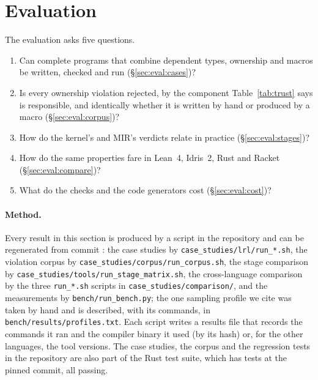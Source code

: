 \section{Evaluation}\label{sec:eval}

The evaluation asks five questions.
\begin{enumerate}\setlength\itemsep{1pt}
\item[\textbf{E1}] Can complete programs that combine dependent types, ownership and macros be written, checked and run (\S\ref{sec:eval:cases})?
\item[\textbf{E2}] Is every ownership violation rejected, by the component Table~\ref{tab:trust} says is responsible, and identically whether it is written by hand or produced by a macro (\S\ref{sec:eval:corpus})?
\item[\textbf{E3}] How do the kernel's and MIR's verdicts relate in practice (\S\ref{sec:eval:stages})?
\item[\textbf{E4}] How do the same properties fare in Lean~4, Idris~2, Rust and Racket (\S\ref{sec:eval:compare})?
\item[\textbf{E5}] What do the checks and the code generators cost (\S\ref{sec:eval:cost})?
\end{enumerate}

\paragraph{Method.}
Every result in this section is produced by a script in the repository and can be regenerated from commit \texttt{\PinnedCommitShort}: the case studies by \texttt{case\_studies/\allowbreak lrl/\allowbreak run\_*.sh}, the violation corpus by \texttt{case\_studies/\allowbreak corpus/\allowbreak run\_corpus.sh}, the stage comparison by \texttt{case\_studies/\allowbreak tools/\allowbreak run\_stage\_matrix.sh}, the cross-language comparison by the three \texttt{run\_*.sh} scripts in \texttt{case\_studies/\allowbreak comparison/}, and the measurements by \texttt{bench/\allowbreak run\_bench.py}; the one sampling profile we cite was taken by hand and is described, with its commands, in \texttt{bench/\allowbreak results/\allowbreak profiles.txt}.
Each script writes a results file that records the commands it ran and the compiler binary it used (by its hash) or, for the other languages, the tool versions.
The case studies, the corpus and the regression tests in the repository are also part of the Rust test suite, which has \NumTestsPassed{} tests at the pinned commit, all passing.

